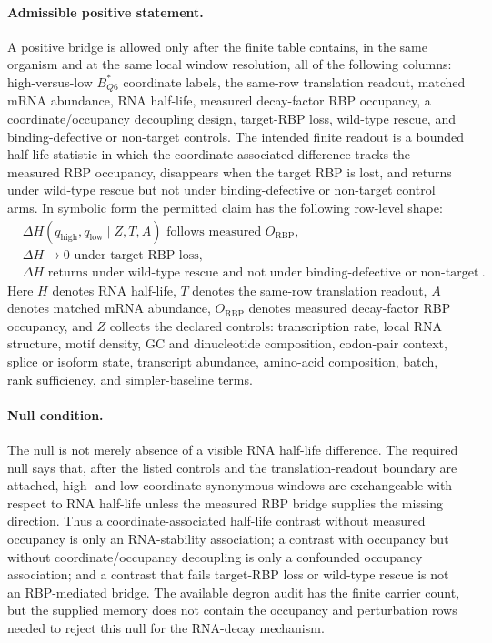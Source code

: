 \paragraph{Admissible positive statement.}
A positive bridge is allowed only after the finite table contains, in the same organism and at the same local window resolution, all of the following columns: high-versus-low $B^*_{Q6}$ coordinate labels, the same-row translation readout, matched mRNA abundance, RNA half-life, measured decay-factor RBP occupancy, a coordinate/occupancy decoupling design, target-RBP loss, wild-type rescue, and binding-defective or non-target controls.  The intended finite readout is a bounded half-life statistic in which the coordinate-associated difference tracks the measured RBP occupancy, disappears when the target RBP is lost, and returns under wild-type rescue but not under binding-defective or non-target control arms.  In symbolic form the permitted claim has the following row-level shape:
$$
\begin{aligned}
&\Delta H(q_{\mathrm{high}},q_{\mathrm{low}} \mid Z,T,A) \text{ follows measured } O_{\mathrm{RBP}}, \\
&\Delta H \to 0 \text{ under target-RBP loss}, \\
&\Delta H \text{ returns under wild-type rescue and not under binding-defective or non-target rescue}.
\end{aligned}
$$
Here $H$ denotes RNA half-life, $T$ denotes the same-row translation readout, $A$ denotes matched mRNA abundance, $O_{\mathrm{RBP}}$ denotes measured decay-factor RBP occupancy, and $Z$ collects the declared controls: transcription rate, local RNA structure, motif density, GC and dinucleotide composition, codon-pair context, splice or isoform state, transcript abundance, amino-acid composition, batch, rank sufficiency, and simpler-baseline terms.

\paragraph{Null condition.}
The null is not merely absence of a visible RNA half-life difference.  The required null says that, after the listed controls and the translation-readout boundary are attached, high- and low-coordinate synonymous windows are exchangeable with respect to RNA half-life unless the measured RBP bridge supplies the missing direction.  Thus a coordinate-associated half-life contrast without measured occupancy is only an RNA-stability association; a contrast with occupancy but without coordinate/occupancy decoupling is only a confounded occupancy association; and a contrast that fails target-RBP loss or wild-type rescue is not an RBP-mediated bridge.  The available degron audit has the finite carrier count, but the supplied memory does not contain the occupancy and perturbation rows needed to reject this null for the RNA-decay mechanism.

